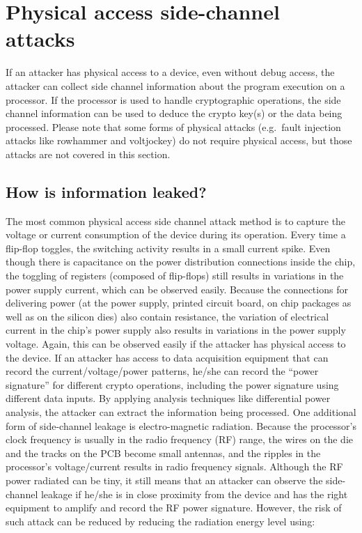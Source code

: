\documentclass[
  a4paper,
]{report}
\begin{document}
\section{Physical access side-channel
attacks}\label{physical-access-side-channel-attacks-1}

If an attacker has physical access to a device, even without debug
access, the attacker can collect side channel information about the
program execution on a processor. If the processor is used to handle
cryptographic operations, the side channel information can be used to
deduce the crypto key(s) or the data being processed. Please note that
some forms of physical attacks (e.g.~fault injection attacks like
rowhammer and voltjockey) do not require physical access, but those
attacks are not covered in this section.

\subsection{How is information leaked?}\label{how-is-information-leaked}

The most common physical access side channel attack method is to capture
the voltage or current consumption of the device during its operation.
Every time a flip-flop toggles, the switching activity results in a
small current spike. Even though there is capacitance on the power
distribution connections inside the chip, the toggling of registers
(composed of flip-flops) still results in variations in the power supply
current, which can be observed easily. Because the connections for
delivering power (at the power supply, printed circuit board, on chip
packages as well as on the silicon dies) also contain resistance, the
variation of electrical current in the chip's power supply also results
in variations in the power supply voltage. Again, this can be observed
easily if the attacker has physical access to the device. If an attacker
has access to data acquisition equipment that can record the
current/voltage/power patterns, he/she can record the ``power
signature'' for different crypto operations, including the power
signature using different data inputs. By applying analysis techniques
like differential power analysis, the attacker can extract the
information being processed. One additional form of side-channel leakage
is electro-magnetic radiation. Because the processor's clock frequency
is usually in the radio frequency (RF) range, the wires on the die and
the tracks on the PCB become small antennas, and the ripples in the
processor's voltage/current results in radio frequency signals. Although
the RF power radiated can be tiny, it still means that an attacker can
observe the side-channel leakage if he/she is in close proximity from
the device and has the right equipment to amplify and record the RF
power signature. However, the risk of such attack can be reduced by
reducing the radiation energy level using:
\end{document}
